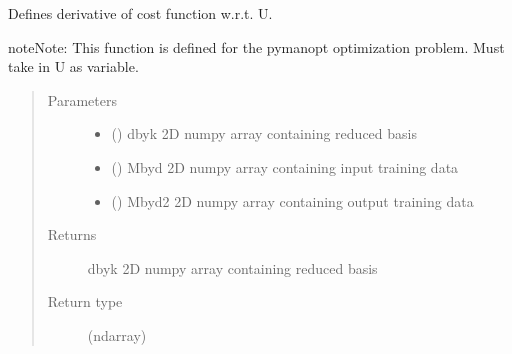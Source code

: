 \documentclass[letterpaper,10pt,english]{sphinxmanual}
\begin{document}
\begin{fulllineitems}
\begin{fulllineitems}
\label{\detokenize{rom:rom.response_surfaces.NN_alt.sub_dres}}
\sphinxAtStartPar
Defines derivative of cost function w.r.t. U.

\begin{sphinxadmonition}{note}{Note:}
\sphinxAtStartPar
This function is defined for the pymanopt optimization problem. Must take in U as variable.
\end{sphinxadmonition}
\begin{quote}\begin{description}
\item[{Parameters}] \leavevmode\begin{itemize}
\item {} 
\sphinxAtStartPar
{} () \textendash{} d\sphinxhyphen{}by\sphinxhyphen{}k 2D numpy array containing reduced basis

\item {} 
\sphinxAtStartPar
{} () \textendash{} M\sphinxhyphen{}by\sphinxhyphen{}d 2D numpy array containing input training data

\item {} 
\sphinxAtStartPar
{} () \textendash{} M\sphinxhyphen{}by\sphinxhyphen{}d2 2D numpy array containing output training data

\end{itemize}

\item[{Returns}] \leavevmode
\sphinxAtStartPar
d\sphinxhyphen{}by\sphinxhyphen{}k 2D numpy array containing reduced basis

\item[{Return type}] \leavevmode
\sphinxAtStartPar
(ndarray)

\end{description}\end{quote}

\end{fulllineitems}



\end{fulllineitems}
\end{document}
